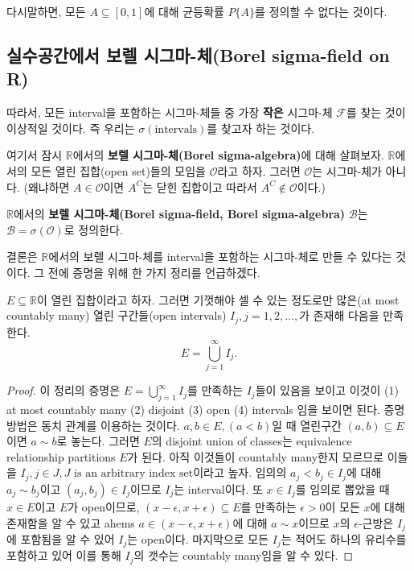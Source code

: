 \documentclass[b5paper,]{scrbook}
\theoremstyle{plain}
\theoremstyle{definition}
\numberwithin{equation}{section}
\let\BeginKnitrBlock\begin \let\EndKnitrBlock\end
\begin{document}
다시말하면, 모든 \(A\subseteq [0,1]\)에 대해 균등확률 \(P\{ A \}\)를
정의할 수 없다는 것이다.

\subsection{실수공간에서 보렐 시그마-체(Borel sigma-field on
R)}\label{---borel-sigma-field-on-r}

따라서, 모든 interval을 포함하는 시그마-체들 중 가장 \textbf{작은}
시그마-체 \(\mathcal{F}\)를 찾는 것이 이상적일 것이다. 즉 우리는
\(\sigma(\text{intervals})\)를 찾고자 하는 것이다.

여기서 잠시 \(\mathbb{R}\)에서의 \textbf{보렐 시그마-체(Borel
sigma-algebra)}에 대해 살펴보자. \(\mathbb{R}\)에서의 모든 열린
집합(open set)들의 모임을 \(\mathcal{O}\)라고 하자. 그러면
\(\mathcal{O}\)는 시그마-체가 아니다. (왜냐하면 \(A\in\mathcal{O}\)이면
\(A^{C}\)는 닫힌 집합이고 따라서 \(A^{C}\notin\mathcal{O}\)이다.)

\BeginKnitrBlock{definition}[보렐 시그마-체]
\protect\hypertarget{def:unnamed-chunk-56}{}{\label{def:unnamed-chunk-56}
{} }\(\mathbb{R}\)에서의 \textbf{보렐
시그마-체(Borel sigma-field, Borel sigma-algebra)} \(\mathcal{B}\)는
\(\mathcal{B}=\sigma(\mathcal{O})\)로 정의한다.
\EndKnitrBlock{definition}

결론은 \(\mathbb{R}\)에서의 보렐 시그마-체를 interval을 포함하는
시그마-체로 만들 수 있다는 것이다. 그 전에 증명을 위해 한 가지 정리를
언급하겠다.

\BeginKnitrBlock{theorem}[열린 집합과 열린 구간들]
\protect\hypertarget{thm:unnamed-chunk-57}{}{\label{thm:unnamed-chunk-57}
{} }\(E \subseteq \mathbb{R}\)이
열린 집합이라고 하자. 그러면 기껏해야 셀 수 있는 정도로만 많은(at most
countably many) 열린 구간들(open intervals) \(I_{j}, j=1,2,\ldots,\)가
존재해 다음을 만족한다. \[E=\bigcup_{j=1}^{\infty}I_{j}.\]
\EndKnitrBlock{theorem}

\BeginKnitrBlock{proof}
{}이 정리의 증명은
\(E=\bigcup_{j=1}^{\infty}I_{j}\)를 만족하는 \(I_{j}\)들이 있음을 보이고
이것이 (1) at most countably many (2) disjoint (3) open (4) intervals
임을 보이면 된다. 증명 방법은 동치 관계를 이용하는 것이다.
\(a, b \in E, (a < b)\)일 때 열린구간 \((a,b)\subseteq E\)이면
\(a \sim b\)로 놓는다. 그러면 \(E\)의 disjoint union of classes는
equivalence relationship partitions \(E\)가 된다. 아직 이것들이
countably many한지 모르므로 이들을
\(I_{j}, j\in J, J \text{ is an arbitrary index set}\)이라고 높자.
임의의 \(a_{j}<b_{j}\in I_{j}\)에 대해 \(a_{j} \sim b_{j}\)이고
\((a_{j}, b_{j}) \in I_{j}\)이므로 \(I_{j}\)는 interval이다. 또
\(x\in I_{j}\)를 임의로 뽑았을 때 \(x\in E\)이고 \(E\)가 open이므로,
\((x-\epsilon, x+\epsilon)\subseteq E\)를 만족하는 \(\epsilon >0\)이
모든 \(x\)에 대해 존재함을 알 수 있고 ahems
\(a\in (x-\epsilon, x+\epsilon)\)에 대해 \(a \sim x\)이므로 \(x\)의
\(\epsilon\)-근방은 \(I_{j}\)에 포함됨을 알 수 있어 \(I_{j}\)는
open이다. 마지막으로 모든 \(I_{j}\)는 적어도 하나의 유리수를 포함하고
있어 이를 통해 \(I_{j}\)의 갯수는 countably many임을 알 수 있다.
\EndKnitrBlock{proof}
\end{document}
